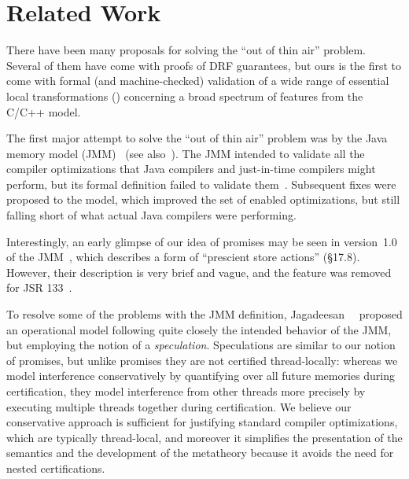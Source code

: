 \section{Related Work}\label{sec:related}


There have been many proposals for solving the ``out of thin air''
problem.  Several of them have come with proofs of DRF guarantees, but
ours is the first to come with formal (and machine-checked) validation
of a wide range of essential local transformations
() concerning a broad spectrum of features
from the C/C++ model.


The first major attempt to solve the ``out of thin air'' problem was by the Java memory model (JMM)~\cite{jmm} (see also~\cite{Lochbihler2014TOPLAS}).
The JMM intended to validate all the compiler optimizations that Java compilers and just-in-time compilers might perform,
but its formal definition failed to validate them~\cite{sevcik:jmm}.
Subsequent fixes were proposed to the model, which improved the set of enabled optimizations, 
but still falling short of what actual Java compilers were performing.

Interestingly, an early glimpse of our idea of promises may be seen in
version~1.0 of the JMM~\cite{jmm-1.0}, which describes a form of
``prescient store actions'' (\S{17.8}).  However, their description is
very brief and vague, and the feature was removed for JSR
133~\cite{jsr133}.

To resolve some of the problems with the JMM definition,
\mbox{Jagadeesan~\etal}~\cite{Jagadeesan2010} proposed an operational
model following quite closely the intended behavior of the JMM, but
employing the notion of a \emph{speculation}.  Speculations are
similar to our notion of promises, but unlike promises they are not
certified thread-locally: whereas we model interference conservatively
by quantifying over all future memories during certification, they
model interference from other threads more precisely by executing
multiple threads together during certification.  We believe our
conservative approach is sufficient for justifying standard compiler
optimizations, which are typically thread-local, and moreover it
simplifies the presentation of the semantics and the development of
the metatheory because it avoids the need for nested certifications.


